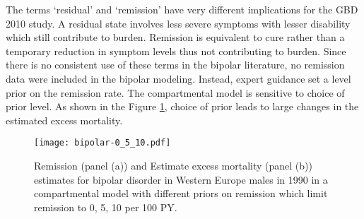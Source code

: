 The terms `residual' and `remission' have very different implications for the GBD 2010 study.  A residual state involves less severe symptoms with lesser disability which still contribute to burden. Remission is equivalent to cure rather than a temporary reduction in symptom levels thus not contributing to burden. Since there is no consistent use of these terms in the bipolar literature, no remission data were included in the bipolar modeling. Instead, expert guidance set a level prior on the remission rate.  The compartmental model is sensitive to choice of prior level.  As shown in the Figure \ref{fig:app-bipolar remission}, choice of prior leads to large changes in the estimated excess mortality.

    \begin{figure}[h]
        \begin{center}
            \texttt{[image: bipolar-0\_5\_10.pdf]}
            \caption{Remission (panel (a)) and Estimate excess mortality (panel (b)) estimates for bipolar disorder in Western Europe males in 1990 in a compartmental model with different priors on remission which limit remission to 0, 5, 10 per 100 PY.}
            \label{fig:app-bipolar remission}
        \end{center}
    \end{figure}

